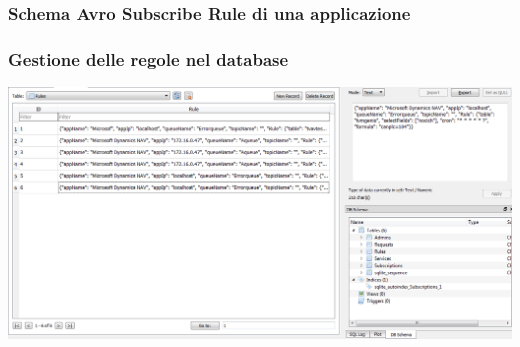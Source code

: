 \documentclass{beamer}
\begin{document}
\begin{frame}
\frametitle{Schema Avro Subscribe Rule di una applicazione}
\begin{figure}%
	\centering
	\qquad
\end{figure}
\end{frame}

\begin{frame}
\frametitle{Gestione delle regole nel database}
\includegraphics[width=1\textwidth]{images/DBPlatform1.png}
\end{frame}
\end{document}
